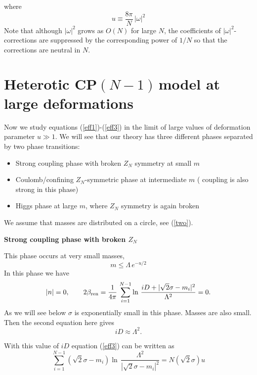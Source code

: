 \documentclass[epsfig,12pt]{article}
\def\beq{\begin{equation}}
\def\eeq{\end{equation}}
\newcommand{\cpn}{CP$(N-1)\,$}
\def\beq{\begin{equation}}
\def\eeq{\end{equation}}
\begin{document}
{where
\beq
u\equiv \frac{8\pi}{N}\,|\omega|^2
\label{u}
\eeq	
Note that although $ |\omega|^2 $ grows as $ O(N) $ for large $N$, the coefficients of 
	$|\omega|^2$-corrections are suppressed by the corresponding power of $ 1/N $ so that 
	the corrections are neutral in $ N $.


\newpage


\section{ Heterotic \cpn model at large  deformations}
\setcounter{equation}{0}



Now we study equations (\ref{eff1})-(\ref{eff3}) in the limit of large values of 
deformation parameter $u\gg 1$. We will see that our theory has three different phases 
separated by two phase transitions:
\begin{itemize}
 \item Strong coupling phase  with broken $Z_N$
symmetry at small $m$
\item  Coulomb/confining $Z_N$-symmetric
phase at intermediate $m$ ( coupling  is also strong in this phase) 
\item Higgs phase
at large $m$, where $Z_N$ symmetry is again broken
\end{itemize}
 We assume that masses are distributed on a circle,
see (\ref{two}).

\begin{center}
{\bf Strong coupling phase with broken $Z_N$}
\end{center}

This phase occurs at very small masses,
\beq
m\le \Lambda\,e^{-u/2}
\label{scphmass}
\eeq
In this phase we have 
\beq
|n|=0,\qquad 2\beta_{\rm ren}=\frac{1}{4\pi}\, 
\sum_{i=1}^{N-1}\ln\, {\frac{iD +|\sqrt{2}\sigma-m_i|^2}{\Lambda^2}} =0.
\label{scphn}
\eeq
As we will see below $\sigma$ is exponentially small in this phase. Masses are also
small. Then the second equation here gives
\beq
iD\approx \Lambda^2.
\label{scphD}
\eeq

With this value of $iD$ equation (\ref{eff3}) can be written as
\beq
 \sum_{i=1}^{N-1}\left(\sqrt{2}\sigma-m_i\right)\ln\, {\frac{\Lambda^2}{|\sqrt{2}\sigma-m_i|^2}}
=N\left(\sqrt{2}\sigma\right)u
\label{scpheq3}
\eeq

}
\end{document}
